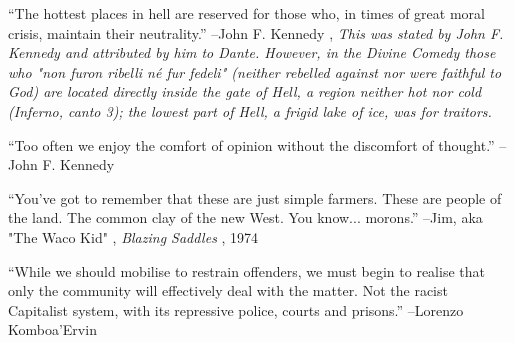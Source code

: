 \documentclass{article}%
\begin{document}
\linebreak%
\vspace{1mm}%
\begin{minipage}{\textwidth}%
\flushleft%
“The hottest places in hell are reserved for those who, in times of great moral crisis, maintain their neutrality.”%
\linebreak%
\vspace{1mm}%
–John F. Kennedy%
, \textit{This was stated by John F. Kennedy and attributed by him to Dante. However, in the Divine Comedy those who "non furon ribelli né fur fedeli" (neither rebelled against nor were faithful to God) are located directly inside the gate of Hell, a region neither hot nor cold (Inferno, canto 3); the lowest part of Hell, a frigid lake of ice, was for traitors.}%
\linebreak%
\vspace{1mm}%
\end{minipage}%
\linebreak%
\vspace{1mm}%
\begin{minipage}{\textwidth}%
\flushleft%
“Too often we enjoy the comfort of opinion without the discomfort of thought.”%
\linebreak%
\vspace{1mm}%
–John F. Kennedy%
\linebreak%
\vspace{1mm}%
\end{minipage}%
\linebreak%
\vspace{1mm}%
\begin{minipage}{\textwidth}%
\flushleft%
“You've got to remember that these are just simple farmers. These are people of the land. The common clay of the new West. You know... morons.”%
\linebreak%
\vspace{1mm}%
–Jim, aka "The Waco Kid"%
, \textit{Blazing Saddles}%
, 1974%
\linebreak%
\vspace{1mm}%
\end{minipage}%
\linebreak%
\vspace{1mm}%
\begin{minipage}{\textwidth}%
\flushleft%
“While we should mobilise to restrain offenders, we must begin to realise that only the community will effectively deal with the matter. Not the racist Capitalist system, with its repressive police, courts and prisons.”%
\linebreak%
\vspace{1mm}%
–Lorenzo Komboa'Ervin%
\linebreak%
\vspace{1mm}%
\end{minipage}%
\end{document}
